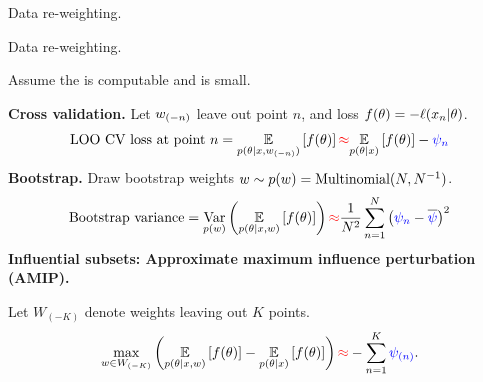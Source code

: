 \begin{frame}{Data re-weighting.}
%
\end{frame}



\begin{frame}[t]{Data re-weighting.}


Assume the  is computable and  is small.
%
\expansion{}


\pause
\textbf{Cross validation.} 
Let $w_{(-n)}$ leave out point $n$, and loss
$f(\theta) = -\ell(x_n \vert \theta)$.
%
%
\begin{align*}
\textrm{LOO CV loss at point }n =
    \underset{p(\theta \vert x, w_{(-n)})}{\mathbb{E}}\left[f(\theta)\right]
\textcolor{red}{\approx} 
    \underset{p(\theta \vert x)}{\mathbb{E}}\left[f(\theta)\right] - \textcolor{blue}{\psi_{n}}
\end{align*}
%
%
\pause
\textbf{Bootstrap.}
Draw bootstrap
weights $w \sim p(w) = \textrm{Multinomial}(N, N^{-1})$.
%
\begin{align*}
%
\textrm{Bootstrap variance} =
\var{\p(\w)}{\expect{p(\theta \vert \x, w)}{f(\theta)}}
\red{\approx} \frac{1}{N^2} \sumn \left(\blue{\infl_n} -
\overline{\blue{\infl}}
    \right)^2
%
\end{align*}
%
\pause
\textbf{Influential subsets:
Approximate maximum influence perturbation (AMIP).}

Let $W_{(-K)}$ denote weights leaving out $K$ points.
%
\begin{align*}
%
\max_{\w \in W_{(-K)}} \left(
\expect{p(\theta \vert \x, w)}{f(\theta)} -
\expect{p(\theta \vert \x)}{f(\theta)}
\right) \red{\approx} - \sum_{n=1}^K \blue{\infl_{(n)}}.
%
\end{align*}
%

\end{frame}


